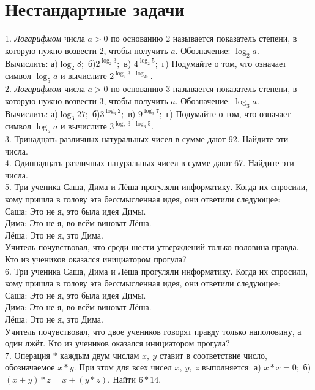 \documentclass[12pt]{article}
\begin{document}
\section{Нестандартные задачи}
1. {\it Логарифмом} числа $a>0$ по основанию 2 называется показатель степени, в которую нужно возвести 2, чтобы получить $a.$ Обозначение: $\log_2 a.$\\
Вычислить: а)$\log_2 8;$ б)$2^{\log_2 3};$ в) $4^{\log_2 5};$ г) Подумайте о том, что означает символ $\log_5 a$ и вычислите $2^{\log_5 3\cdot\log_25}.$\\
2. {\it Логарифмом} числа $a>0$ по основанию 3 называется показатель степени, в которую нужно возвести 3, чтобы получить $a.$ Обозначение: $\log_3 a.$\\
Вычислить: а)$\log_3 27;$ б)$3^{\log_3 2};$ в) $9^{\log_3 7};$ г) Подумайте о том, что означает символ $\log_5 a$ и вычислите $3^{\log_5 3\cdot\log_3 5}.$\\
3. Тринадцать различных натуральных чисел в сумме дают 92. Найдите эти числа.\\
4. Одиннадцать различных натуральных чисел в сумме дают 67. Найдите эти числа.\\
5. Три ученика Саша, Дима и Лёша прогуляли информатику. Когда их спросили, кому пришла в голову эта бессмысленная идея, они ответили следующее:\\
Саша: Это не я, это была идея Димы.\\
Дима: Это не я, во всём виноват Лёша.\\
Лёша: Это не я, это Дима.\\
Учитель почувствовал, что среди шести утверждений только половина правда. Кто из учеников оказался инициатором прогула?\\
6. Три ученика Саша, Дима и Лёша прогуляли информатику. Когда их спросили, кому пришла в голову эта бессмысленная идея, они ответили следующее:\\
Саша: Это не я, это была идея Димы.\\
Дима: Это не я, во всём виноват Лёша.\\
Лёша: Это не я, это Дима.\\
Учитель почувствовал, что двое учеников говорят правду только наполовину, а один лжёт. Кто из учеников оказался инициатором прогула?\\
7. Операция $*$ каждым двум числам $x,\ y$ ставит в соответствие число, обозначаемое $x*y.$ При этом для всех чисел $x,\ y,\ z$ выполняется: а) $x*x=0;$ б) $(x+y)*z=x+(y*z).$ Найти $6*14.$\\
\end{document}
